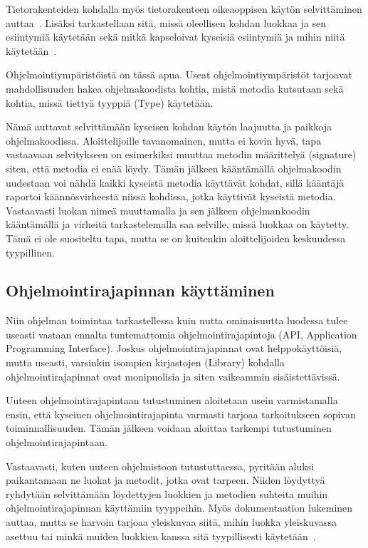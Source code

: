 \documentclass[finnish]{tktltiki2}
\theoremstyle{definition}
\theoremstyle{remark}
\begin{document}
Tietorakenteiden kohdalla myös tietorakenteen oikeaoppisen käytön selvittäminen auttaa~\cite{eliciting-design-requirements-for-maintenance-oriented-ides}. Lisäksi tarkastellaan sitä, missä oleellisen kohdan luokkaa ja sen esiintymiä käytetään sekä mitkä kapseloivat kyseisiä esiintymiä ja mihin niitä käytetään~\cite{questions-during-software-evolution-tasks}.

Ohjelmointiympäristöistä on tässä apua. Useat ohjelmointiympäristöt tarjoavat mahdollisuuden hakea ohjelmakoodista kohtia, mistä metodia kutsutaan sekä kohtia, missä tiettyä tyyppiä (Type) käytetään.

Nämä auttavat selvittämään kyseisen kohdan käytön laajuutta ja paikkoja ohjelmakoodissa. Aloittelijoille tavanomainen, mutta ei kovin hyvä, tapa vastaavaan selvitykseen on esimerkiksi muuttaa metodin määrittelyä (signature) siten, että metodia ei enää löydy. Tämän jälkeen kääntämällä ohjelmakoodin uudestaan voi nähdä kaikki kyseistä metodia käyttävät kohdat, sillä kääntäjä raportoi käännösvirheestä niissä kohdissa, jotka käyttivät kyseistä metodia. Vastaavasti luokan nimeä muuttamalla ja sen jälkeen ohjelmankoodin kääntämällä ja virheitä tarkastelemalla saa selville, missä luokkaa on käytetty. Tämä ei ole suositeltu tapa, mutta se on kuitenkin aloittelijoiden keskuudessa tyypillinen.

\subsection{Ohjelmointirajapinnan käyttäminen}
Niin ohjelman toimintaa tarkastellessa kuin uutta ominaisuutta luodessa tulee useasti vastaan ennalta tuntemattomia ohjelmointirajapintoja (API, Application Programming Interface).
Joskus ohjelmointirajapinnat ovat helppokäyttöisiä, mutta useasti, varsinkin isompien kirjastojen (Library) kohdalla ohjelmointirajapinnat ovat monipuolisia ja siten vaikeammin sisäistettävissä.

Uuteen ohjelmointirajapintaan tutustuminen aloitetaan usein varmistamalla ensin, että kyseinen ohjelmointirajapinta varmasti tarjoaa tarkoitukseen sopivan toiminnallisuuden. Tämän jälkeen voidaan aloittaa tarkempi tutustuminen ohjelmointirajapintaan.

Vastaavasti, kuten uuteen ohjelmistoon tutustuttaessa, pyritään aluksi paikantamaan ne luokat ja metodit, jotka ovat tarpeen. Niiden löydyttyä ryhdytään selvittämään löydettyjen luokkien ja metodien suhteita muihin ohjelmointirajapinnan käyttämiin tyyppeihin. Myös dokumentaation lukeminen auttaa, mutta se harvoin tarjoaa yleiskuvaa siitä, mihin luokka yleiskuvassa asettuu tai minkä muiden luokkien kanssa sitä tyypillisesti käytetään~\cite{asking-and-answering-api-questions}.
\end{document}
